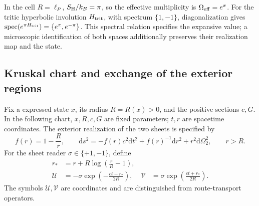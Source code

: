 In the cell \(R=\ell_P\), \(S_{\rm H}/k_B=\pi\), so
the effective multiplicity is \(\Omega_{\rm eff}=e^\pi\).
For the tritic hyperbolic involution \(H_{\rm trit}\), with spectrum
\(\{1,-1\}\), diagonalization gives
\(\operatorname{spec}(e^{\pi H_{\rm trit}})=\{e^\pi,e^{-\pi}\}\).
This spectral relation specifies the expansive value; a microscopic
identification of both spaces additionally preserves their realization
map and the state.



\subsection{Kruskal chart and exchange of the exterior regions}
\label{vii:subsec:kruskal-dos-hojas}

Fix a expressed state \(x\), its radius \(R=R(x)>0\), and the
positive sections \(c,G\). In the following chart, \(x,R,c,G\)
are fixed parameters; \(t,r\) are spacetime coordinates.
The exterior realization of the two sheets is specified by
\begin{equation}
 f(r)=1-\frac Rr,\qquad
 \mathrm ds^2=-f(r)c^2\mathrm dt^2+f(r)^{-1}\mathrm dr^2
                 +r^2\mathrm d\Omega_2^2,\qquad r>R.
 \label{vii:eq:metrica-exterior}
\end{equation}
For the sheet reader \(\sigma\in\{+1,-1\}\), define
\begin{align}
 r_*&=r+R\log\left(\frac rR-1\right),\\
 \mathcal U&=-\sigma\exp\left(-\frac{ct-r_*}{2R}\right),&
 \mathcal V&=\sigma\exp\left(\frac{ct+r_*}{2R}\right).
 \label{vii:eq:carta-kruskal}
\end{align}
The symbols \(\mathcal U,\mathcal V\) are coordinates and are
distinguished from route-transport operators.

